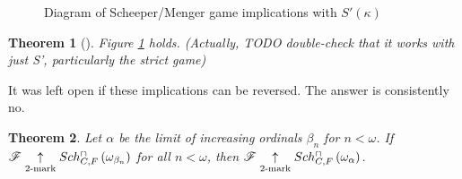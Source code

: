 \documentclass{amsart}
\theoremstyle{plain}
\newtheorem{theorem}{Theorem}
\theoremstyle{definition}
\theoremstyle{remark}
\theoremstyle{plain}
\theoremstyle{definition}
\theoremstyle{remark}
\begin{document}
  \begin{figure}[h]
\begin{center}
\end{center}
\caption{Diagram of Scheeper/Menger game implications with \(S'(\kappa)\)}
\label{GamesDiagram2}
\end{figure}

  \begin{theorem}[\cite{clontzMengerGamePreprint}]
    Figure \ref{GamesDiagram2} holds.
    (Actually, TODO double-check that it works with just S', particularly
    the strict game)
  \end{theorem}

  It was left open if these implications can be reversed. The answer is
  consistently no.

  \begin{theorem}
    Let \(\alpha\) be the limit of increasing ordinals \(\beta_n\) for \(n<\omega\).
    If \(\mathscr{F} \underset{2\text{-mark}}{\uparrow}Sch^{\cap}_{C,F}\left({\omega_{\beta_n}}\right)\) for all
    \(n<\omega\), then \(\mathscr{F}\underset{2\text{-mark}}{\uparrow}Sch^{\cap}_{C,F}\left({\omega_\alpha}\right)\).
  \end{theorem}
\end{document}
